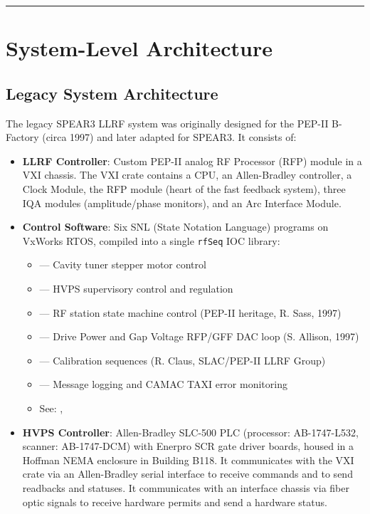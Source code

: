 {\begin{center}\rule{0.5\linewidth}{0.5pt}\end{center}

\section{System-Level Architecture}\label{system-level-architecture}

\subsection{Legacy System Architecture}\label{legacy-system-architecture}

The legacy SPEAR3 LLRF system was originally designed for the PEP-II B-Factory (circa 1997) and later adapted for SPEAR3. It consists of:

\begin{itemize}
\tightlist
\item
  \textbf{LLRF Controller}: Custom PEP-II analog RF Processor (RFP) module in a VXI chassis. The VXI crate contains a CPU, an Allen-Bradley controller, a Clock Module, the RFP module (heart of the fast feedback system), three IQA modules (amplitude/phase monitors), and an Arc Interface Module.
\item
  \textbf{Control Software}: Six SNL (State Notation Language) programs on VxWorks RTOS, compiled into a single \texttt{rfSeq} IOC library:

  \begin{itemize}
  \tightlist
  \item
     --- Cavity tuner stepper motor control
  \item
     --- HVPS supervisory control and regulation
  \item
     --- RF station state machine control (PEP-II heritage, R. Sass, 1997)
  \item
     --- Drive Power and Gap Voltage RFP/GFF DAC loop (S. Allison, 1997)
  \item
     --- Calibration sequences (R. Claus, SLAC/PEP-II LLRF Group)
  \item
     --- Message logging and CAMAC TAXI error monitoring
  \item
    See: , 
  \end{itemize}
\item
  \textbf{HVPS Controller}: Allen-Bradley SLC-500 PLC (processor: AB-1747-L532, scanner: AB-1747-DCM) with Enerpro SCR gate driver boards, housed in a Hoffman NEMA enclosure in Building B118. It communicates with the VXI crate via an Allen-Bradley serial interface to receive commands and to send readbacks and statuses. It communicates with an interface chassis via fiber optic signals to receive hardware permits and send a hardware status.


\end{itemize}}
